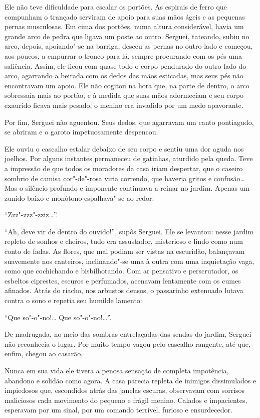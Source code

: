 Ele não teve dificuldade para escalar os portões. As espirais de ferro
que compunham o trançado serviram de apoio para suas mãos ágeis e as
pequenas pernas musculosas. Em cima dos portões, numa altura
considerável, havia um grande arco de pedra que ligava um poste ao
outro. Serguei, tateando, subiu no arco, depois, apoiando"-se na barriga,
desceu as pernas no outro lado e começou, aos poucos, a empurrar o
tronco para lá, sempre procurando com os pés uma saliência. Assim, ele
ficou com quase todo o corpo pendurado do outro lado do arco, agarrando
a beirada com os dedos das mãos esticadas, mas seus pés não encontravam
um apoio. Ele não cogitou na hora que, na parte de dentro, o arco
sobressaía mais ao portão, e à medida que suas mãos adormeciam e seu
corpo exaurido ficava mais pesado, o menino era invadido por um medo
apavorante.

Por fim, Serguei não aguentou. Seus dedos, que agarravam um canto
pontiagudo, se abriram e o garoto impetuosamente despencou.

Ele ouviu o cascalho estalar debaixo de seu corpo e sentiu uma dor aguda
nos joelhos. Por alguns instantes permaneceu de gatinhas, aturdido
pela queda. Teve a impressão de que todos os moradores da casa iriam
despertar, que o caseiro sombrio de camisa cor"-de"-rosa viria correndo,
que haveria gritos e confusão\ldots{} Mas o silêncio profundo e imponente
continuava a reinar no jardim. Apenas um zunido baixo e monótono
espalhava"-se ao redor:

``Zzz"-zzz"-zziz\ldots{}''.

``Ah, deve vir de dentro do ouvido!'', supôs Serguei. Ele se levantou:
nesse jardim repleto de sonhos e cheiros, tudo era assustador,
misterioso e lindo como num conto de fadas. As flores, que mal podiam
ser vistas na escuridão, balançavam suavemente nos canteiros,
inclinando"-se uma à outra com uma inquietação vaga, como que cochichando
e bisbilhotando. Com ar pensativo e perscrutador, os esbeltos ciprestes,
escuros e perfumados, acenavam lentamente com os cumes afinados. Atrás
do riacho, nos arbustos densos, o passarinho extenuado lutava contra o
sono e repetia seu humilde lamento:

``Que so"-o"-no!\ldots{} Que so"-o"-no!\ldots{}''.

De madrugada, no meio das sombras entrelaçadas das sendas do jardim,
Serguei não reconhecia o lugar. Por muito tempo vagou pelo cascalho
rangente, até que, enfim, chegou ao casarão.

Nunca em sua vida ele tivera a penosa sensação de completa impotência,
abandono e solidão como agora. A casa parecia repleta de inimigos
dissimulados e impiedosos que, escondidos atrás das janelas escuras,
observavam com sorrisos maliciosos cada movimento do pequeno e frágil
menino. Calados e impacientes, esperavam por um sinal, por um comando
terrível, furioso e ensurdecedor.

